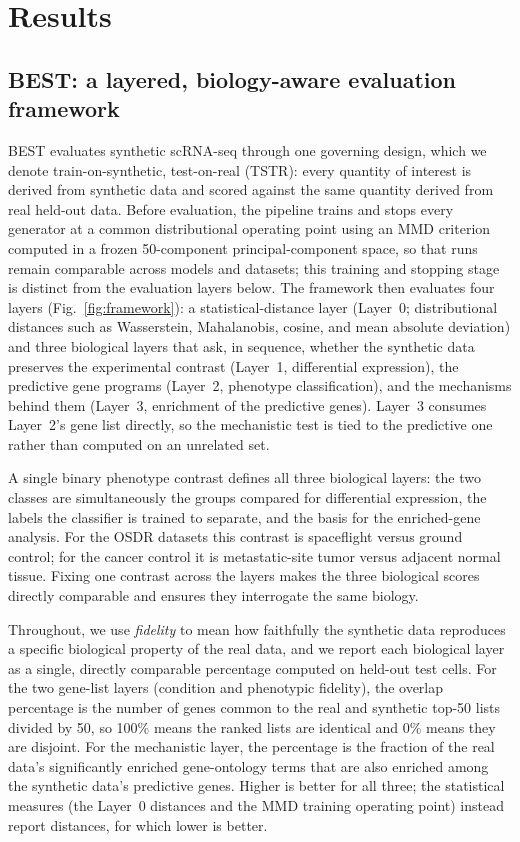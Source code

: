 \documentclass[11pt]{article}
\newcommand{\fides}{BEST}
\begin{document}
\section{Results}

\subsection{\fides{}: a layered, biology-aware evaluation framework}
\fides{} evaluates synthetic scRNA-seq through one governing design, which we denote train-on-synthetic, test-on-real (TSTR): every quantity of interest is derived from synthetic data and scored against the same quantity derived from real held-out data. Before evaluation, the pipeline trains and stops every generator at a common distributional operating point using an MMD criterion computed in a frozen 50-component principal-component space, so that runs remain comparable across models and datasets; this training and stopping stage is distinct from the evaluation layers below. The framework then evaluates four layers (Fig.~\ref{fig:framework}): a statistical-distance layer (Layer~0; distributional distances such as Wasserstein, Mahalanobis, cosine, and mean absolute deviation) and three biological layers that ask, in sequence, whether the synthetic data preserves the experimental contrast (Layer~1, differential expression), the predictive gene programs (Layer~2, phenotype classification), and the mechanisms behind them (Layer~3, enrichment of the predictive genes). Layer~3 consumes Layer~2's gene list directly, so the mechanistic test is tied to the predictive one rather than computed on an unrelated set.

A single binary phenotype contrast defines all three biological layers: the two classes are simultaneously the groups compared for differential expression, the labels the classifier is trained to separate, and the basis for the enriched-gene analysis. For the OSDR datasets this contrast is spaceflight versus ground control; for the cancer control it is metastatic-site tumor versus adjacent normal tissue. Fixing one contrast across the layers makes the three biological scores directly comparable and ensures they interrogate the same biology.

Throughout, we use \emph{fidelity} to mean how faithfully the synthetic data reproduces a specific biological property of the real data, and we report each biological layer as a single, directly comparable percentage computed on held-out test cells. For the two gene-list layers (condition and phenotypic fidelity), the overlap percentage is the number of genes common to the real and synthetic top-50 lists divided by 50, so 100\% means the ranked lists are identical and 0\% means they are disjoint. For the mechanistic layer, the percentage is the fraction of the real data's significantly enriched gene-ontology terms that are also enriched among the synthetic data's predictive genes. Higher is better for all three; the statistical measures (the Layer~0 distances and the MMD training operating point) instead report distances, for which lower is better.
\end{document}
